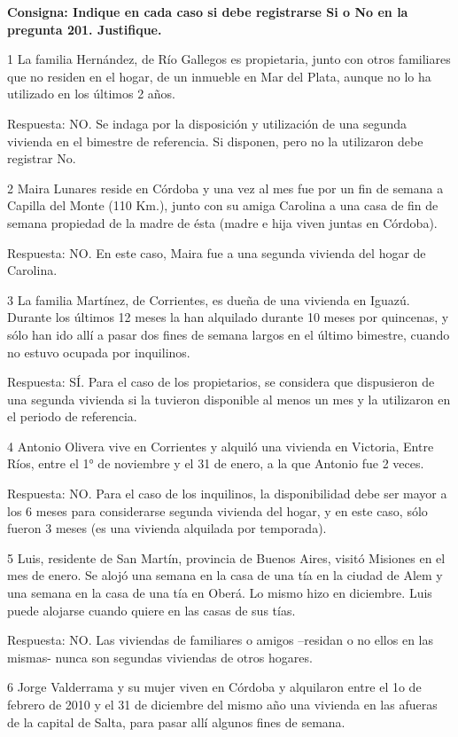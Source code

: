 \documentclass[
  openany]{book}
\begin{document}
\textbf{Consigna: Indique en cada caso si debe registrarse Si o No en la pregunta 201. Justifique.}

1 La familia Hernández, de Río Gallegos es propietaria, junto con otros familiares que no residen en el hogar, de un inmueble en Mar del Plata, aunque no lo ha utilizado en los últimos 2 años.

Respuesta: NO. Se indaga por la disposición y utilización de una segunda vivienda en el bimestre de referencia. Si disponen, pero no la utilizaron debe registrar No.

2 Maira Lunares reside en Córdoba y una vez al mes fue por un fin de semana a Capilla del Monte (110 Km.), junto con su amiga Carolina a una casa de fin de semana propiedad de la madre de ésta (madre e hija viven juntas en Córdoba).

Respuesta: NO. En este caso, Maira fue a una segunda vivienda del hogar de Carolina.

3 La familia Martínez, de Corrientes, es dueña de una vivienda en Iguazú. Durante los últimos 12 meses la han alquilado durante 10 meses por quincenas, y sólo han ido allí a pasar dos fines de semana largos en el último bimestre, cuando no estuvo ocupada por inquilinos.

Respuesta: SÍ. Para el caso de los propietarios, se considera que dispusieron de una segunda vivienda si la tuvieron disponible al menos un mes y la utilizaron en el periodo de referencia.

4 Antonio Olivera vive en Corrientes y alquiló una vivienda en Victoria, Entre Ríos, entre el 1° de noviembre y el 31 de enero, a la que Antonio fue 2 veces.

Respuesta: NO. Para el caso de los inquilinos, la disponibilidad debe ser mayor a los 6 meses para considerarse segunda vivienda del hogar, y en este caso, sólo fueron 3 meses (es una vivienda alquilada por temporada).

5 Luis, residente de San Martín, provincia de Buenos Aires, visitó Misiones en el mes de enero. Se alojó una semana en la casa de una tía en la ciudad de Alem y una semana en la casa de una tía en Oberá. Lo mismo hizo en diciembre. Luis puede alojarse cuando quiere en las casas de sus tías.

Respuesta: NO. Las viviendas de familiares o amigos --residan o no ellos en las mismas- nunca son segundas viviendas de otros hogares.

6 Jorge Valderrama y su mujer viven en Córdoba y alquilaron entre el 1o de febrero de 2010 y el 31 de diciembre del mismo año una vivienda en las afueras de la capital de Salta, para pasar allí algunos fines de semana.
\end{document}
